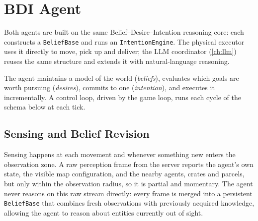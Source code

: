 \chapter{BDI Agent}
\label{ch:bdi}
Both agents are built on the same Belief--Desire--Intention reasoning core: each
constructs a \texttt{BeliefBase} and runs an \texttt{IntentionEngine}. The physical
executor uses it directly to move, pick up and deliver; the LLM coordinator
(\cref{ch:llm}) reuses the same structure and extends it with
natural-language reasoning.

The agent maintains a model of the world (\emph{beliefs}), evaluates which goals
are worth pursuing (\emph{desires}), commits to one (\emph{intention}), and
executes it incrementally. A control loop, driven by the game loop, runs each cycle
of the schema below at each tick.

\begin{center}
\end{center}


\section{Sensing and Belief Revision}
\label{sec:sensing-beliefs}
Sensing happens at each movement and whenever something new enters the observation 
zone. A raw perception frame from the server reports the agent's own state, the
visible map configuration, and the nearby agents, crates and parcels, but only
within the observation radius, so it is partial and momentary. The agent never
reasons on this raw stream directly: every frame is merged into a persistent
\texttt{BeliefBase} that combines fresh observations with previously acquired
knowledge, allowing the agent to reason about entities currently out of sight.\\

